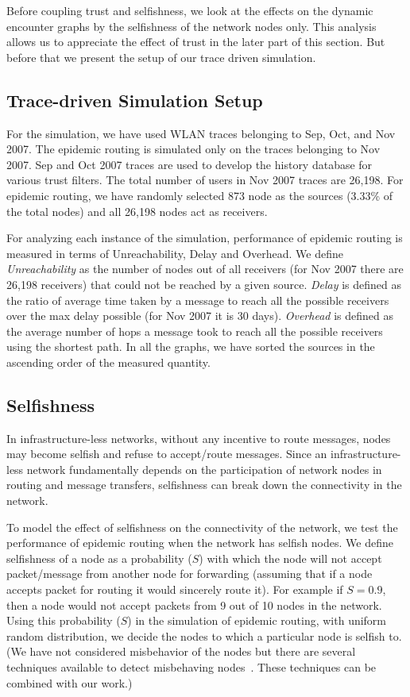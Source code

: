 \documentclass[10pt,conference]{IEEEtran}
\begin{document}
Before coupling trust and selfishness, we look at the effects on the dynamic encounter graphs by the selfishness of the network nodes only. This analysis allows us to appreciate the effect of trust in the later part of this section. But before that we present the setup of our trace driven simulation.

\subsection{Trace-driven Simulation Setup}

For the simulation, we have used WLAN traces belonging to Sep, Oct, and Nov 2007. The epidemic routing is simulated only on the traces belonging to Nov 2007. Sep and Oct 2007 traces are used to develop the history database for various trust filters. The total number of users in Nov 2007 traces are 26,198. For epidemic routing, we have randomly selected 873 node as the sources (3.33\% of the total nodes) and all 26,198 nodes act as receivers. 

For analyzing each instance of the simulation, performance of epidemic routing is measured in terms of Unreachability, Delay and Overhead. We define \textit{Unreachability}  as the number of nodes out of all receivers (for Nov 2007 there are 26,198 receivers) that could not be reached  by a given source. \textit{Delay} is defined as the ratio of average time taken by a message to reach all the possible receivers over the max delay possible (for Nov 2007 it is 30 days). \textit{Overhead} is defined as the average number of hops a message took to reach all the possible receivers using the shortest path. In all the graphs, we have sorted the sources in the ascending order of the measured quantity. 

\subsection{Selfishness}


In  infrastructure-less networks, without any incentive to route messages, nodes may become selfish and refuse to accept/route messages. Since an infrastructure-less network fundamentally depends on the participation of network nodes in routing and message transfers, selfishness can break down the connectivity in the network. 

To model the effect of selfishness on the connectivity of the network, we test the performance of epidemic routing when the network has selfish nodes. We define selfishness of a node as a probability ($S$) with which the node will not accept packet/message from another node for forwarding (assuming that if a node accepts packet for routing it would sincerely route it). For example if $S = 0.9$, then a node would not accept packets from 9 out of 10 nodes in the network. Using this probability ($S$) in the simulation of epidemic routing, with uniform random distribution, we decide the nodes to which a particular node is selfish to. (We have not considered misbehavior of the nodes but there are several techniques available to detect misbehaving nodes~\cite{Marti00mitigatingrouting,locationcentricisolation}. These techniques can be combined with our work.)
\end{document}
